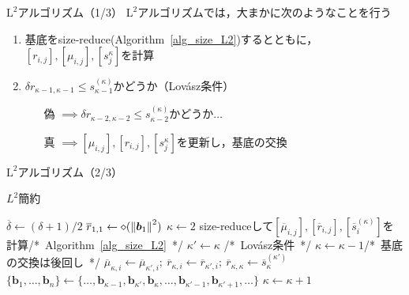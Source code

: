 \documentclass[12pt,aspectratio=169,table,dvipdfmx, leqno]{beamer}
\renewcommand{\Comment}[1]{\quad/*~#1~*/}
\begin{document}
\begin{frame}{$\text{L}^2$アルゴリズム（1/3）}
$\text{L}^2$アルゴリズムでは，大まかに次のようなことを行う
\begin{enumerate}
    \item 基底をsize-reduce(Algorithm~\ref{alg_size_L2})するとともに，$[r_{i, j}], [\mu_{i, j}], [s_j^{\kappa}]$を計算
    \item $\delta r_{\kappa-1, \kappa-1}\le s_{\kappa-1}^{(\kappa)}$かどうか（Lov\'asz条件）
    \begin{itemize}
        \item[偽] $\implies$$\delta r_{\kappa-2, \kappa-2}\le s_{\kappa-2}^{(\kappa)}$かどうか$\ldots$
        \item[真] $\implies$$[\mu_{i, j}], [r_{i, j}], [s_j^{\kappa}]$を更新し，基底の交換 
    \end{itemize}
\end{enumerate}
\end{frame}

\begin{frame}{$\text{L}^2$アルゴリズム（2/3）}
\begin{algorithm}[H]
    \footnotesize
    \begin{algorithmic}[1]
        \caption{\footnotesize $L^2$簡約\cite{NS05}}
        \label{alg_L2}
        \State $\overline{\delta}\gets(\delta+1)/2$
        \State $\overline{r}_{1,1}\gets\diamond(\norm{\bm{b}_1}^2)$
        \State $\kappa\gets 2$
            \State size-reduceして$[\overline{\mu}_{i, j}], [\overline{r}_{i, j}], [\overline{s}_{i}^{(\kappa)}]$を計算\Comment{Algorithm~\ref{alg_size_L2}}
            \State $\kappa'\gets\kappa$
            \Comment{Lov\'asz条件}
                \State $\kappa\gets\kappa-1$\Comment{基底の交換は後回し}
            \EndWhile
                \State $\overline{\mu}_{\kappa, i}\gets\overline{\mu}_{\kappa', i};~\overline{r}_{\kappa, i}\gets\overline{r}_{\kappa', i};~\overline{r}_{\kappa, \kappa}\gets\overline{s}_{\kappa}^{(\kappa')}$
            \EndFor
            \State $\{\bm{b}_1,\ldots,\bm{b}_n\}\gets\{\ldots,\bm{b}_{\kappa-1}, \bm{b}_{\kappa'}, \bm{b}_{\kappa},\ldots,\bm{b}_{\kappa'-1},\bm{b}_{\kappa'+1},\ldots\}$%
            \State $\kappa\gets \kappa+1$
        \EndWhile
    \end{algorithmic}
\end{algorithm}
\end{frame}
\end{document}
